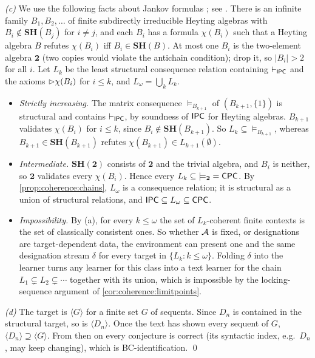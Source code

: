 \emph{(c)} We use the following facts about Jankov formulas \citep{jankov1968construction}; see \citet[ch.~9]{chagrov1997modal}. There is an infinite family $B_1,B_2,\dots$ of finite subdirectly irreducible Heyting algebras with $B_i\notin\mathbf{SH}(B_j)$ for $i\neq j$, and each $B_i$ has a formula $\chi(B_i)$ such that a Heyting algebra $B$ refutes $\chi(B_i)$ iff $B_i\in\mathbf{SH}(B)$. At most one $B_i$ is the two-element algebra $\mathbf2$ (two copies would violate the antichain condition); drop it, so $|B_i|>2$ for all $i$. Let $L_k$ be the least structural consequence relation containing $\vdash_{\mathsf{IPC}}$ and the axioms $\rhd\chi(B_i)$ for $i\le k$, and $L_\omega=\bigcup_kL_k$.
\begin{itemize}[leftmargin=*]
\item \emph{Strictly increasing.} The matrix consequence $\models_{B_{k+1}}$ of $(B_{k+1},\{1\})$ is structural and contains $\vdash_{\mathsf{IPC}}$, by soundness of $\mathsf{IPC}$ for Heyting algebras. $B_{k+1}$ validates $\chi(B_i)$ for $i\le k$, since $B_i\notin\mathbf{SH}(B_{k+1})$. So $L_k\subseteq{\models_{B_{k+1}}}$, whereas $B_{k+1}\in\mathbf{SH}(B_{k+1})$ refutes $\chi(B_{k+1})\in L_{k+1}(\emptyset)$.
\item \emph{Intermediate.} $\mathbf{SH}(\mathbf2)$ consists of $\mathbf2$ and the trivial algebra, and $B_i$ is neither, so $\mathbf2$ validates every $\chi(B_i)$. Hence every $L_k\subseteq{\models_{\mathbf2}}=\mathsf{CPC}$. By \cref{prop:coherence:chains}, $L_\omega$ is a consequence relation; it is structural as a union of structural relations, and $\mathsf{IPC}\subseteq L_\omega\subseteq\mathsf{CPC}$.
\item \emph{Impossibility.} By (a), for every $k\le\omega$ the set of $L_k$-coherent finite contexts is the set of classically consistent ones. So whether $\mathcal{A}$ is fixed, or designations are target-dependent data, the environment can present one and the same designation stream $\delta$ for every target in $\{L_k:k\le\omega\}$. Folding $\delta$ into the learner turns any learner for this class into a text learner for the chain $L_1\subsetneq L_2\subsetneq\cdots$ together with its union, which is impossible by the locking-sequence argument of \cref{cor:coherence:limitpoints}.
\end{itemize}

\emph{(d)} The target is $\langle G\rangle$ for a finite set $G$ of sequents. Since $D_n$ is contained in the structural target, so is $\langle D_n\rangle$. Once the text has shown every sequent of $G$, $\langle D_n\rangle\supseteq\langle G\rangle$. From then on every conjecture is correct (its syntactic index, e.g.\ $D_n$, may keep changing), which is BC-identification. \qed

